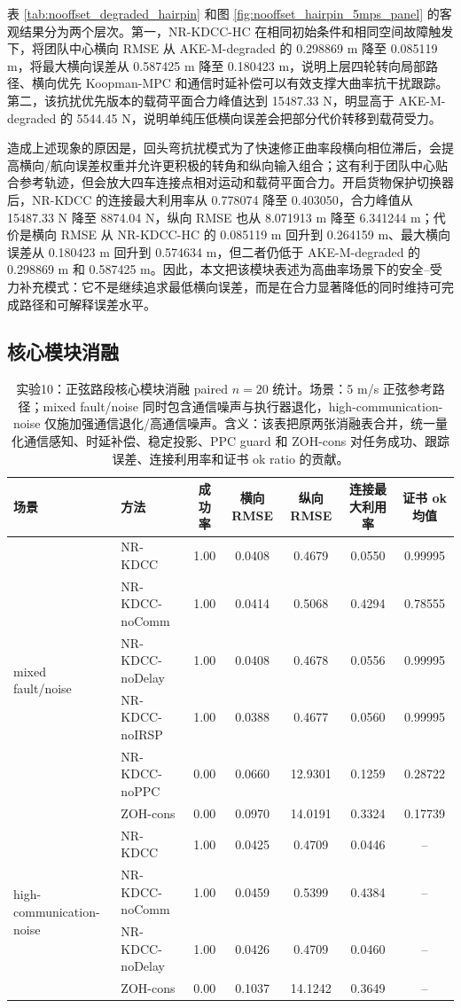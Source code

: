 \documentclass[twocolumn,3p,times,procedia]{elsarticle}
\newcommand{\Method}{NR-KDCC}
\newcommand{\AKEdeg}{AKE-M-degraded}
\newcommand{\MethodHC}{NR-KDCC-HC}
\newcommand{\ZOHcons}{ZOH-cons}
\begin{document}
表 \ref{tab:nooffset_degraded_hairpin} 和图 \ref{fig:nooffset_hairpin_5mps_panel} 的客观结果分为两个层次。第一，\MethodHC{} 在相同初始条件和相同空间故障触发下，将团队中心横向 RMSE 从 \AKEdeg{} 的 0.298869 m 降至 0.085119 m，将最大横向误差从 0.587425 m 降至 0.180423 m，说明上层四轮转向局部路径、横向优先 Koopman-MPC 和通信时延补偿可以有效支撑大曲率抗干扰跟踪。第二，该抗扰优先版本的载荷平面合力峰值达到 15487.33 N，明显高于 \AKEdeg{} 的 5544.45 N，说明单纯压低横向误差会把部分代价转移到载荷受力。

造成上述现象的原因是，回头弯抗扰模式为了快速修正曲率段横向相位滞后，会提高横向/航向误差权重并允许更积极的转角和纵向输入组合；这有利于团队中心贴合参考轨迹，但会放大四车连接点相对运动和载荷平面合力。开启货物保护切换器后，\Method{} 的连接最大利用率从 0.778074 降至 0.403050，合力峰值从 15487.33 N 降至 8874.04 N，纵向 RMSE 也从 8.071913 m 降至 6.341244 m；代价是横向 RMSE 从 \MethodHC{} 的 0.085119 m 回升到 0.264159 m、最大横向误差从 0.180423 m 回升到 0.574634 m，但二者仍低于 \AKEdeg{} 的 0.298869 m 和 0.587425 m。因此，本文把该模块表述为高曲率场景下的安全--受力补充模式：它不是继续追求最低横向误差，而是在合力显著降低的同时维持可完成路径和可解释误差水平。

\subsection{核心模块消融}

\begin{table}[!tbp]
\centering
\caption{实验10：正弦路段核心模块消融 paired $n=20$ 统计。场景：5 m/s 正弦参考路径；mixed fault/noise 同时包含通信噪声与执行器退化，high-communication-noise 仅施加强通信退化/高通信噪声。含义：该表把原两张消融表合并，统一量化通信感知、时延补偿、稳定投影、PPC guard 和 \ZOHcons{} 对任务成功、跟踪误差、连接利用率和证书 ok ratio 的贡献。}
\label{tab:e2_ablation}
\footnotesize
\begin{tabular}{llccccc}
\toprule
场景 & 方法 & 成功率 & 横向 RMSE & 纵向 RMSE & 连接最大利用率 & 证书 ok 均值 \\
\midrule
\multirow{6}{*}{mixed fault/noise}
& \Method{} & 1.00 & 0.0408 & 0.4679 & 0.0550 & 0.99995\\
& \Method{}-noComm & 1.00 & 0.0414 & 0.5068 & 0.4294 & 0.78555\\
& \Method{}-noDelay & 1.00 & 0.0408 & 0.4678 & 0.0556 & 0.99995\\
& \Method{}-noIRSP & 1.00 & 0.0388 & 0.4677 & 0.0560 & 0.99995\\
& \Method{}-noPPC & 0.00 & 0.0660 & 12.9301 & 0.1259 & 0.28722\\
& \ZOHcons{} & 0.00 & 0.0970 & 14.0191 & 0.3324 & 0.17739\\
\midrule
\multirow{4}{*}{high-communication-noise}
& \Method{} & 1.00 & 0.0425 & 0.4709 & 0.0446 & --\\
& \Method{}-noComm & 1.00 & 0.0459 & 0.5399 & 0.4384 & --\\
& \Method{}-noDelay & 1.00 & 0.0426 & 0.4709 & 0.0460 & --\\
& \ZOHcons{} & 0.00 & 0.1037 & 14.1242 & 0.3649 & --\\
\bottomrule
\end{tabular}
\end{table}
\end{document}
